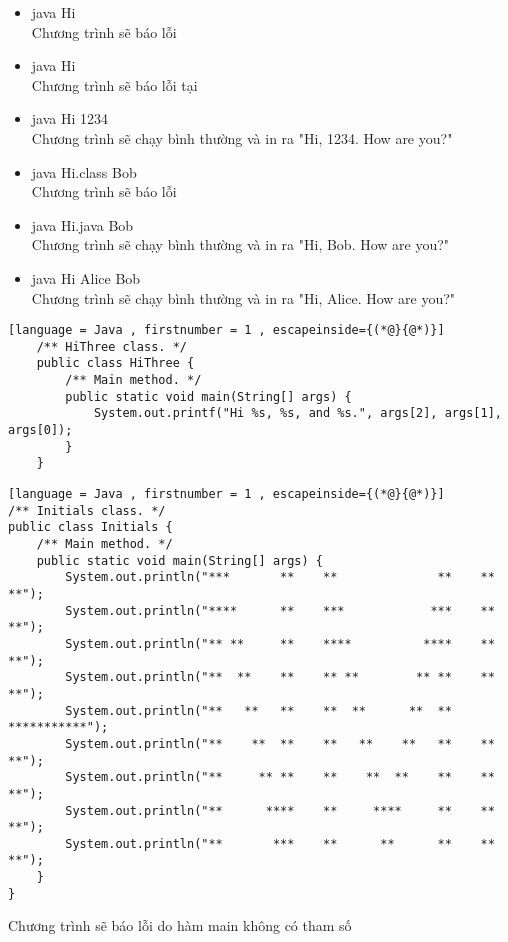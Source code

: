 \documentclass[12pt]{article}
\begin{document}
\begin{exercise}
\begin{itemize}
\item java Hi\\
Chương trình sẽ báo lỗi 

\item java Hi \\
Chương trình sẽ báo lỗi 
 tại 

\item java Hi 1234\\
Chương trình sẽ chạy bình thường và in ra "Hi, 1234. How are you?"

\item java Hi.class Bob\\
Chương trình sẽ báo lỗi 

\item java Hi.java Bob\\
Chương trình sẽ chạy bình thường và in ra "Hi, Bob. How are you?"

\item java Hi Alice Bob\\
Chương trình sẽ chạy bình thường và in ra "Hi, Alice. How are you?"

\end{itemize}
\end{exercise}

\begin{exercise}
\begin{lstlisting}[language = Java , firstnumber = 1 , escapeinside={(*@}{@*)}]
    /** HiThree class. */
    public class HiThree {
        /** Main method. */
        public static void main(String[] args) {
            System.out.printf("Hi %s, %s, and %s.", args[2], args[1], args[0]);
        }
    }
\end{lstlisting}
\end{exercise}

\begin{exercise}
\begin{lstlisting}[language = Java , firstnumber = 1 , escapeinside={(*@}{@*)}]
/** Initials class. */
public class Initials {
    /** Main method. */
    public static void main(String[] args) {
        System.out.println("***       **    **              **    **       **");
        System.out.println("****      **    ***            ***    **       **");
        System.out.println("** **     **    ****          ****    **       **");
        System.out.println("**  **    **    ** **        ** **    **       **");
        System.out.println("**   **   **    **  **      **  **    ***********");
        System.out.println("**    **  **    **   **    **   **    **       **");
        System.out.println("**     ** **    **    **  **    **    **       **");
        System.out.println("**      ****    **     ****     **    **       **");
        System.out.println("**       ***    **      **      **    **       **");
    }
}
\end{lstlisting}
\end{exercise}

\begin{exercise}
Chương trình sẽ báo lỗi 
do hàm main không có tham số
\end{exercise}
\end{document}
